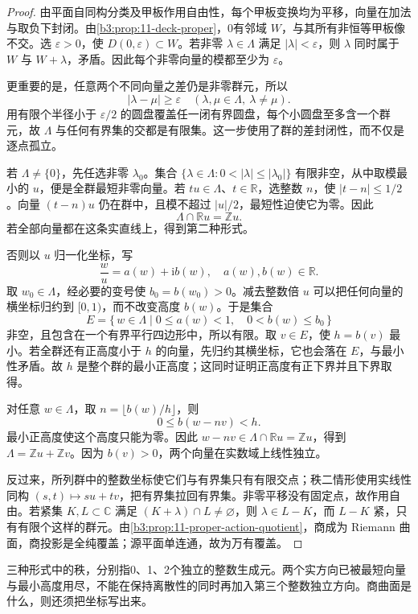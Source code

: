 \begin{proof}
由平面自同构分类及甲板作用自由性，每个甲板变换均为平移，向量在加法与取负下封闭。由\cref{b3:prop:11-deck-proper}，0有邻域 \(W\)，与其所有非恒等甲板像不交。选 \(\varepsilon>0\)，使 \(D(0,\varepsilon)\subset W\)。若非零 \(\lambda\in\Lambda\) 满足 \(|\lambda|<\varepsilon\)，则 \(\lambda\) 同时属于 \(W\) 与 \(W+\lambda\)，矛盾。因此每个非零向量的模都至少为 \(\varepsilon\)。

更重要的是，任意两个不同向量之差仍是非零群元，所以
\[
 |\lambda-\mu|\ge\varepsilon
 \quad(\lambda,\mu\in\Lambda,\ \lambda\ne\mu).
\]
用有限个半径小于 \(\varepsilon/2\) 的圆盘覆盖任一闭有界圆盘，每个小圆盘至多含一个群元，故 \(\Lambda\) 与任何有界集的交都是有限集。这一步使用了群的差封闭性，而不仅是逐点孤立。

若 \(\Lambda\ne\{0\}\)，先任选非零 \(\lambda_0\)。集合
\(\{\lambda\in\Lambda:0<|\lambda|\le|\lambda_0|\}\)
有限非空，从中取模最小的 \(u\)，便是全群最短非零向量。若 \(tu\in\Lambda\)、\(t\in\mathbb R\)，选整数 \(n\)，使 \(|t-n|\le1/2\)。向量 \((t-n)u\) 仍在群中，且模不超过 \(|u|/2\)，最短性迫使它为零。因此
\[
 \Lambda\cap\mathbb Ru=\mathbb Zu.
\]
若全部向量都在这条实直线上，得到第二种形式。

否则以 \(u\) 归一化坐标，写
\[
 \frac wu=a(w)+\mathrm i b(w),\quad a(w),b(w)\in\mathbb R.
\]
取 \(w_0\in\Lambda\)，经必要的变号使 \(b_0=b(w_0)>0\)。减去整数倍 \(u\) 可以把任何向量的横坐标归约到 \([0,1)\)，而不改变高度 \(b(w)\)。于是集合
\[
 E=\{\,w\in\Lambda\mid0\le a(w)<1,\quad0<b(w)\le b_0\,\}
\]
非空，且包含在一个有界平行四边形中，所以有限。取 \(v\in E\)，使 \(h=b(v)\) 最小。若全群还有正高度小于 \(h\) 的向量，先归约其横坐标，它也会落在 \(E\)，与最小性矛盾。故 \(h\) 是整个群的最小正高度；这同时证明正高度有正下界并且下界取得。

对任意 \(w\in\Lambda\)，取 \(n=\lfloor b(w)/h\rfloor\)，则
\[
 0\le b(w-nv)<h.
\]
最小正高度使这个高度只能为零。因此 \(w-nv\in\Lambda\cap\mathbb Ru=\mathbb Zu\)，得到 \(\Lambda=\mathbb Zu+\mathbb Zv\)。因为 \(b(v)>0\)，两个向量在实数域上线性独立。

反过来，所列群中的整数坐标使它们与有界集只有有限交点；秩二情形使用实线性同构 \((s,t)\mapsto su+tv\)，把有界集拉回有界集。非零平移没有固定点，故作用自由。若紧集 \(K,L\subset\mathbb C\) 满足 \((K+\lambda)\cap L\ne\varnothing\)，则 \(\lambda\in L-K\)，而 \(L-K\) 紧，只有有限个这样的群元。由\cref{b3:prop:11-proper-action-quotient}，商成为 Riemann 曲面，商投影是全纯覆盖；源平面单连通，故为万有覆盖。
\end{proof}
三种形式中的秩，分别指0、1、2个独立的整数生成元。两个实方向已被最短向量与最小高度用尽，不能在保持离散性的同时再加入第三个整数独立方向。商曲面是什么，则还须把坐标写出来。

